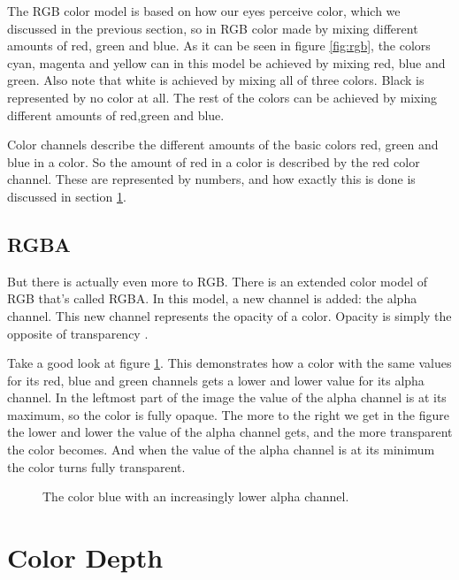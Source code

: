 The RGB color model is based on how our eyes perceive color, which we
discussed in the previous section, so in RGB color made by mixing
different amounts of red, green and blue. As it can be seen in figure
\ref{fig:rgb}, the colors cyan, magenta and yellow can in this model
be achieved by mixing red, blue and green. Also note that white is
achieved by mixing all of three colors. Black is represented by no
color at all. The rest of the colors can be achieved by mixing
different amounts of red,green and blue.

Color channels describe the different amounts of the basic colors red,
green and blue in a color. So the amount of red in a color is
described by the red color channel. These are represented by numbers,
and how exactly this is done is discussed in section
\ref{sec:color-depth}.

\subsection{RGBA}


But there is actually even more to RGB. There is an extended color
model of RGB that's called RGBA. In this model, a new channel is
added: the alpha channel. This new channel
represents the opacity of a color. Opacity is simply the opposite of
transparency \cite{porter84_compos_dig_img,murray1996encyclopedia,niederst1999webdesign}.

Take a good look at figure \ref{fig:alpha}. This demonstrates how a
color with the same values for its red, blue and green channels gets a
lower and lower value for its alpha channel. In the leftmost part of
the image the value of the alpha channel is at its maximum, so the
color is fully opaque. The more to the right we get in the figure the
lower and lower the value of the alpha channel gets, and the more
transparent the color becomes. And when the value of the alpha channel
is at its minimum the color turns fully transparent.

\begin{figure}
  \centering
  \caption{The color blue with an increasingly lower alpha channel.}
  \label{fig:alpha}
\end{figure}

\newcommand{\rgbtrip}[3]{\mbox{(#1,#2,#3)}}

\section{Color Depth}
\label{sec:color-depth}

